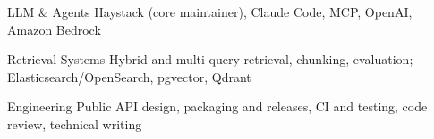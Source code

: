 


\begin{cvskills}



  \cvskill
    {LLM \& Agents} %
    {Haystack (core maintainer), Claude Code, MCP, OpenAI, Amazon Bedrock} %

  \cvskill
    {Retrieval Systems} %
    {Hybrid and multi-query retrieval, chunking, evaluation; Elasticsearch/OpenSearch, pgvector, Qdrant} %

  \cvskill
    {Engineering} %
    {Public API design, packaging and releases, CI and testing, code review, technical writing} %


\end{cvskills}
